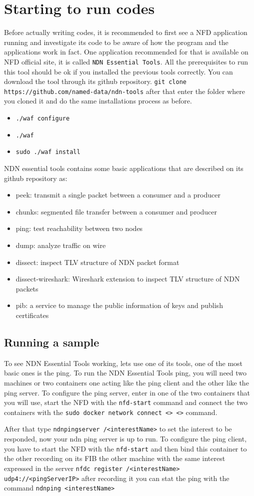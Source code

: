 \documentclass[11pt,conference]{./IEEEtran}
\begin{document}
\section{Starting to run codes}
Before actually writing codes, it is recommended to first see a NFD application running and investigate its code to be aware of how the program and the applications work in fact.
One application recommended for that is available on NFD official site, it is called \texttt{NDN Essential Tools}. All the prerequisites to run this tool should be ok if you installed the previous tools correctly.
You can download the tool through its github repository. \texttt{git clone https://github.com/named-data/ndn-tools} after that enter the folder where you cloned it and do the same installations process as before.
\begin{itemize}
 \item \texttt{./waf configure} 
 \item \texttt{./waf}
 \item \texttt{sudo ./waf install}
\end{itemize}
NDN essential tools contains some basic applications that are described on its github repository as:

\begin{itemize}

\item    peek: transmit a single packet between a consumer and a producer
\item    chunks: segmented file transfer between a consumer and producer
\item    ping: test reachability between two nodes
\item    dump: analyze traffic on wire
\item    dissect: inspect TLV structure of NDN packet format
\item    dissect-wireshark: Wireshark extension to inspect TLV structure of NDN packets
\item    pib: a service to manage the public information of keys and publish certificates
\end{itemize}
\subsection{Running a sample}
To see NDN Essential Tools working, lets use one of its tools, one of the most basic ones is the ping. To run the NDN Essential Tools ping, you will need two machines or two containers one acting like the ping client and the other like the ping server.
To configure the ping server, enter in one of the two containers that you will use, start the NFD  with the \texttt{nfd-start} command and connect the two containers with the \texttt{sudo docker network connect <> <>} command. \par
After that type \texttt{ndnpingserver /<interestName>} to set the interest to be responded, now your ndn ping server is up to run.
To configure the ping client, you have to start the NFD  with the \texttt{nfd-start} and then bind this container to the other recording on its FIB the other machine with the same interest expressed in the server \texttt{nfdc register /<interestName> udp4://<pingServerIP>} after recording it you can stat the ping with the command \texttt{ndnping <interestName>}
\end{document}
